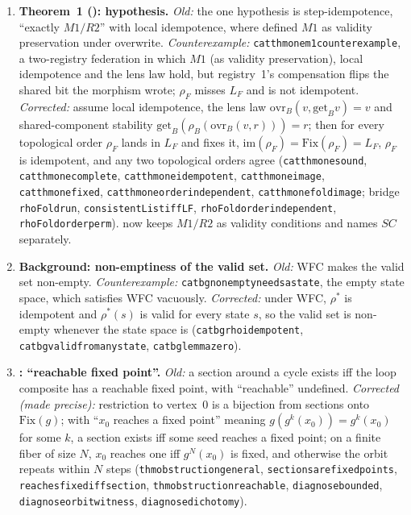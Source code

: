 \documentclass[11pt,a4paper]{article}
\theoremstyle{plain}
\theoremstyle{definition}
\theoremstyle{remark}
\renewcommand{\_}{\origunderscore\allowbreak}
\begin{document}
\begin{enumerate}[leftmargin=*, label=\textbf{E\arabic*.}]
\item \textbf{Theorem~1 (): hypothesis.}
  \emph{Old:} the one hypothesis is step-idempotence, ``exactly $M1/R2$'' with local idempotence,
  where  defined $M1$ as validity preservation under overwrite.
  \emph{Counterexample:} \texttt{cat\_thm\_one\_m1\_counterexample}, a two-registry federation in
  which $M1$ (as validity preservation), local idempotence and the lens law hold, but registry~1's
  compensation flips the shared bit the morphism wrote; $\rho_F$ misses $L_F$ and is not idempotent.
  \emph{Corrected:} assume local idempotence, the lens law $\mathrm{ovr}_B(v, \mathrm{get}_B v) = v$
  and shared-component stability $\mathrm{get}_B(\rho_B(\mathrm{ovr}_B(v, r))) = r$; then for every
  topological order $\rho_F$ lands in $L_F$ and fixes it, $\mathrm{im}(\rho_F) = \mathrm{Fix}(\rho_F)
  = L_F$, $\rho_F$ is idempotent, and any two topological orders agree
  (\texttt{cat\_thm\_one\_sound}, \texttt{cat\_thm\_one\_complete}, \texttt{cat\_thm\_one\_idempotent},
  \texttt{cat\_thm\_one\_image}, \texttt{cat\_thm\_one\_fixed}, \texttt{cat\_thm\_one\_order\_independent},
  \texttt{cat\_thm\_one\_fold\_image}; bridge \texttt{rhoFold\_run}, \texttt{consistentList\_iff\_LF},
  \texttt{rhoFold\_order\_independent}, \texttt{rhoFold\_order\_perm}).  now keeps
  $M1/R2$ as validity conditions and names $SC$ separately.

\item \textbf{Background: non-emptiness of the valid set.}
  \emph{Old:} WFC makes the valid set non-empty. \emph{Counterexample:}
  \texttt{cat\_bg\_nonempty\_needs\_a\_state}, the empty state space, which satisfies WFC vacuously.
  \emph{Corrected:} under WFC, $\rho^*$ is idempotent and $\rho^*(s)$ is valid for every state $s$, so
  the valid set is non-empty whenever the state space is (\texttt{cat\_bg\_rho\_idempotent},
  \texttt{cat\_bg\_valid\_from\_any\_state}, \texttt{cat\_bg\_lemma\_zero}).

\item \textbf{: ``reachable fixed point''.}
  \emph{Old:} a section around a cycle exists iff the loop composite has a reachable fixed point, with
  ``reachable'' undefined. \emph{Corrected (made precise):} restriction to vertex~$0$ is a bijection
  from sections onto $\mathrm{Fix}(g)$; with ``$x_0$ reaches a fixed point'' meaning $g(g^k(x_0)) =
  g^k(x_0)$ for some $k$, a section exists iff some seed reaches a fixed point; on a finite fiber of
  size $N$, $x_0$ reaches one iff $g^N(x_0)$ is fixed, and otherwise the orbit repeats within $N$
  steps (\texttt{thm\_obstruction\_general}, \texttt{sections\_are\_fixed\_points},
  \texttt{reaches\_fixed\_iff\_section}, \texttt{thm\_obstruction\_reachable},
  \texttt{diagnose\_bounded}, \texttt{diagnose\_orbit\_witness}, \texttt{diagnose\_dichotomy}).


\end{enumerate}
\end{document}
